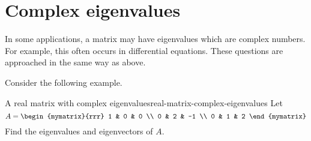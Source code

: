 \section{Complex eigenvalues}

In some applications, a matrix may have eigenvalues
 which are complex numbers. For example, this often occurs in
differential equations. These questions are approached in the same way as above.

Consider the following example.

\begin{example}{A real matrix with complex eigenvalues}{real-matrix-complex-eigenvalues}
Let
\begin{equation*}
A=\begin{mymatrix}{rrr}
1 & 0 &  0 \\
0 & 2 & -1 \\
0 & 1 &  2
\end{mymatrix}
\end{equation*}
Find the eigenvalues and eigenvectors of $A$.
\end{example}

